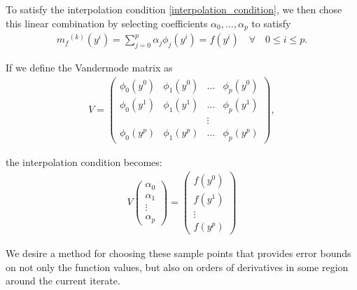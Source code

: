 \documentclass{article}
\theoremstyle{case}
\numberwithin{theorem}{subsection}
\newcommand{\mfk}{{{m}_f}^{(k)}}
\begin{document}
To satisfy the interpolation condition \cref{interpolation_condition}, we then chose this linear combination by selecting coefficients $\alpha_0, \ldots, \alpha_p$ to satisfy
\begin{align}
\label{interpolation_formula}
    \mfk(y^i) = \sum^p_{j=0}\alpha_j\phi_j(y^i) = f(y^i) \quad \forall \quad 0 \le i \le p.
\end{align}

If we define the Vandermode matrix as
\begin{align}
\label{vandermonde}
V=
\begin{pmatrix}
    \phi_0(y^0)      & \phi_1(y^0)       & \ldots & \phi_{p}(y^0)      \\
    \phi_0(y^1)      & \phi_1(y^1)       & \dots  & \phi_{p}(y^1)      \\
                     &                   & \vdots &                    \\
    \phi_0(y^{p})    & \phi_1(y^{p})     & \ldots & \phi_{p}(y^{p})
\end{pmatrix},
\end{align}

the interpolation condition becomes:
\begin{align}
\label{matrix_form}
V
\begin{pmatrix}
    \alpha_0     \\
    \alpha_1     \\
    \vdots       \\
    \alpha_p
\end{pmatrix}
=
\begin{pmatrix}
    f(y^0)     \\
    f(y^1)     \\
    \vdots     \\
    f(y^p)
\end{pmatrix}
\end{align}

We desire a method for choosing these sample points that provides error bounds on not only the function values, but also on orders of derivatives in some region around the current iterate.

\end{document}
